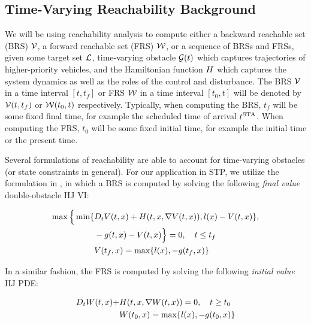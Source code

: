 \subsection{Time-Varying Reachability Background \label{sec:HJIVI}}
We will be using reachability analysis to compute either a backward reachable set (BRS) $\mathcal{V}$, a forward reachable set (FRS) $\mathcal{W}$, or a sequence of BRSs and FRSs, given some target set $\mathcal{L}$, time-varying obstacle $\mathcal{G}(t)$ which captures trajectories of higher-priority vehicles, and the Hamiltonian function $H$ which captures the system dynamics as well as the roles of the control and disturbance. The BRS $\mathcal{V}$ in a time interval $[t, t_f]$ or FRS $\mathcal{W}$ in a time interval $[t_0, t]$ will be denoted by $\mathcal{V}(t, t_f)$ or $\mathcal{W}(t_0, t)$ respectively. Typically, when computing the BRS, $t_f$ will be some fixed final time, for example the scheduled time of arrival $t^\text{STA}$. When computing the FRS, $t_0$ will be some fixed initial time, for example the initial time or the present time.

Several formulations of reachability are able to account for time-varying obstacles \cite{Bokanowski11, Fisac15} (or state constraints in general). For our application in STP, we utilize the formulation in \cite{Fisac15}, in which a BRS is computed by solving the following \textit{final value} double-obstacle HJ VI:

\begin{equation}
\label{eq:HJIVI_BRS}
\begin{aligned}
\max \Big\{ \min \{&D_t \valfunc(t, \state) + \ham(t, \state, \nabla \valfunc(t, \state)), \fc(\state) - \valfunc(t, \state) \}, \\
&-\obsfunc(t, \state) - \valfunc(t, \state) \Big\} = 0, \quad t \le t_f \\
&\valfunc(t_f, \state) = \max\{\fc(\state), -\obsfunc(t_f, \state)\}
\end{aligned}
\end{equation}

In a similar fashion, the FRS is computed by solving the following \textit{initial value} HJ PDE:

\begin{equation}
\label{eq:HJIVI_FRS}
\begin{aligned}
D_t \valfuncfwd(t, \state) + &\ham(t, \state, \nabla \valfuncfwd(t, \state)) = 0 , \quad t \ge t_0  \\
&\valfuncfwd(t_0, \state) = \max\{\fc(\state), -\obsfunc(t_0, \state)\}
\end{aligned}
\end{equation}

